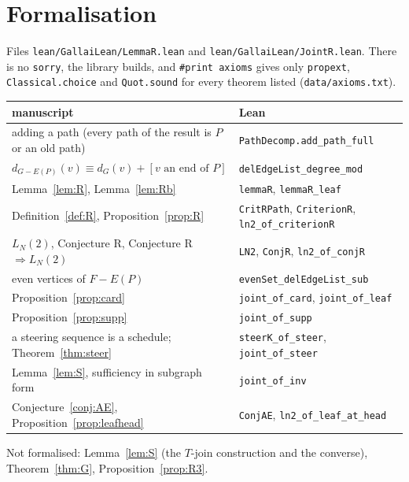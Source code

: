\documentclass[11pt]{amsart}
\theoremstyle{definition}
\begin{document}
\section{Formalisation}\label{sec:lean}
Files \texttt{lean/GallaiLean/LemmaR.lean} and \texttt{lean/GallaiLean/JointR.lean}. There is no
\texttt{sorry}, the library builds, and \texttt{\#print axioms} gives only \texttt{propext},
\texttt{Classical.choice} and \texttt{Quot.sound} for every theorem listed
(\texttt{data/axioms.txt}).
\begin{center}\footnotesize
\begin{tabular}{@{}ll@{}}
\toprule
manuscript & Lean\\
\midrule
adding a path (every path of the result is $P$ or an old path) & \texttt{PathDecomp.add\_path\_full}\\
$d_{G-E(P)}(v)\equiv d_G(v)+[v\text{ an end of }P]$ & \texttt{delEdgeList\_degree\_mod}\\
Lemma~\ref{lem:R}, Lemma~\ref{lem:Rb} & \texttt{lemmaR}, \texttt{lemmaR\_leaf}\\
Definition~\ref{def:R}, Proposition~\ref{prop:R} & \texttt{CritRPath}, \texttt{CriterionR}, \texttt{ln2\_of\_criterionR}\\
$L_N(2)$, Conjecture R, Conjecture R $\Rightarrow L_N(2)$ & \texttt{LN2}, \texttt{ConjR}, \texttt{ln2\_of\_conjR}\\
even vertices of $F-E(P)$ & \texttt{evenSet\_delEdgeList\_sub}\\
Proposition~\ref{prop:card} & \texttt{joint\_of\_card}, \texttt{joint\_of\_leaf}\\
Proposition~\ref{prop:supp} & \texttt{joint\_of\_supp}\\
a steering sequence is a schedule; Theorem~\ref{thm:steer} & \texttt{steerK\_of\_steer}, \texttt{joint\_of\_steer}\\
Lemma~\ref{lem:S}, sufficiency in subgraph form & \texttt{joint\_of\_inv}\\
Conjecture~\ref{conj:AE}, Proposition~\ref{prop:leafhead} & \texttt{ConjAE}, \texttt{ln2\_of\_leaf\_at\_head}\\
\bottomrule
\end{tabular}
\end{center}
Not formalised: Lemma~\ref{lem:S} (the $T$-join construction and the converse), Theorem~\ref{thm:G},
Proposition~\ref{prop:R3}.
\end{document}
